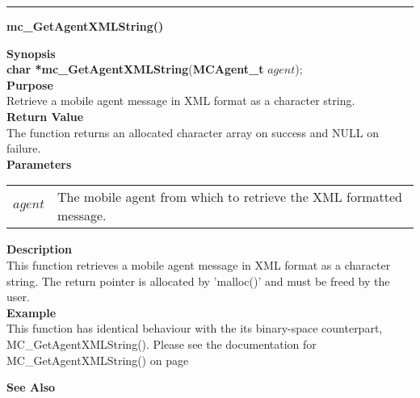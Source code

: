 \noindent
\vspace{5pt}
\rule{6.5in}{0.015in}
\noindent
{\LARGE \bf mc\_GetAgentXMLString()}\\
{}

\noindent
{\bf Synopsis}\\
{\bf char *mc\_GetAgentXMLString}({\bf MCAgent\_t} $agent$);\\

\noindent
{\bf Purpose}\\
Retrieve a mobile agent message in XML format as a character string.\\

\noindent
{\bf Return Value}\\
The function returns an allocated character array on success and NULL on 
failure.\\

\noindent
{\bf Parameters}
\vspace{-0.1in}
\begin{description}
\item               
\begin{tabular}{p{10 mm}p{145 mm}}
$agent$ & The mobile agent from which to retrieve the XML formatted message.
\end{tabular}
\end{description}

\noindent
{\bf Description}\\
This function retrieves a mobile agent message in XML format as a character 
string. 
The return pointer is allocated by 'malloc()' and must be freed by the user.\\

\noindent
{\bf Example}\\
This function has identical behaviour with the its binary-space counterpart,
MC\_GetAgentXMLString(). Please see the documentation for 
MC\_GetAgentXMLString() on page \pageref{api:MC_GetAgentXMLString}
\noindent

\noindent
{\bf See Also}\\

